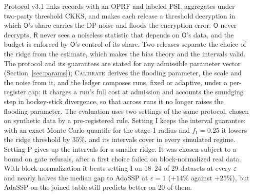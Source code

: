 \documentclass[11pt]{article}
\theoremstyle{definition}
\theoremstyle{plain}
\newcommand{\Party}[1]{\textsf{#1}}
\newcommand{\Rp}{\Party{R}}
\newcommand{\Op}{\Party{O}}
\begin{document}
Protocol v3.1 links records with an OPRF and labeled PSI, aggregates under two-party threshold CKKS, and makes each release a threshold decryption in which $\Op$'s share carries the DP noise and floods the encryption error. $\Op$ never decrypts, $\Rp$ never sees a noiseless statistic that depends on $\Op$'s data, and the budget is enforced by $\Op$'s control of its share. Two releases separate the choice of the ridge from the estimate, which makes the bias theory and the intervals valid. The protocol and its guarantees are stated for any admissible parameter vector (Section~\ref{sec:params}); \textsc{Calibrate} derives the flooding parameter, the scale and the noise from it, and the ledger composes runs, fixed or adaptive, under a per-register cap: it charges a run's full cost at admission and accounts the smudging step in hockey-stick divergence, so that across runs it no longer raises the flooding parameter. The evaluation uses two settings of the same protocol, chosen on synthetic data by a pre-registered rule. Setting I keeps the interval guarantee: with an exact Monte Carlo quantile for the stage-1 radius and $f_1 = 0.25$ it lowers the ridge threshold by $35\%$, and its intervals cover in every simulated regime. Setting P gives up the intervals for a smaller ridge. It was chosen subject to a bound on gate refusals, after a first choice failed on block-normalized real data. With block normalization it beats setting I on 18--24 of 29 datasets at every $\varepsilon$ and nearly halves the median gap to AdaSSP at $\varepsilon = 1$ ($+14\%$ against $+25\%$), but AdaSSP on the joined table still predicts better on 20 of them.
\end{document}
